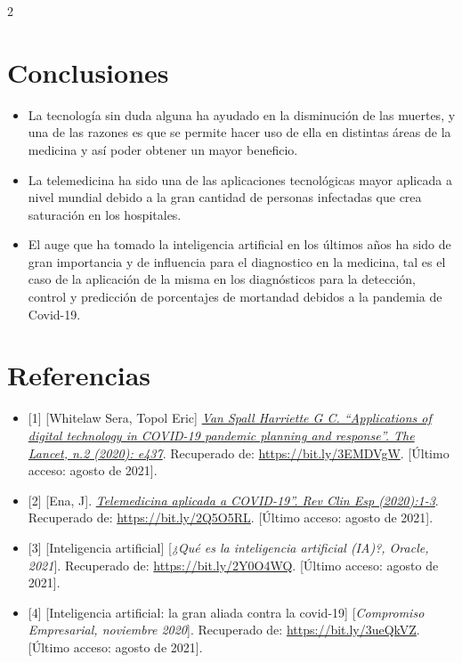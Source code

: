 \documentclass[12pt,spanish,Letterpaper,openany]{book}
\begin{document}
\begin {multicols}{2}
\hypertarget{conclusiones-3}{%
\section{Conclusiones}\label{conclusiones-3}}

\begin{itemize}
\item
  La tecnología sin duda alguna ha ayudado en la disminución de las muertes, y una de las razones
  es que se permite hacer uso de ella en distintas áreas de la medicina y así poder obtener un mayor
  beneficio.
\item
  La telemedicina ha sido una de las aplicaciones tecnológicas mayor aplicada a nivel mundial
  debido a la gran cantidad de personas infectadas que crea saturación en los hospitales.
\item
  El auge que ha tomado la inteligencia artificial en los últimos años ha sido de gran importancia y
  de influencia para el diagnostico en la medicina, tal es el caso de la aplicación de la misma en los
  diagnósticos para la detección, control y predicción de porcentajes de mortandad debidos a la
  pandemia de Covid-19.
\end{itemize}

\hypertarget{referencias-4}{%
\section{Referencias}\label{referencias-4}}

\begin{itemize}
\item
  {[}1{]} {[}Whitelaw Sera, Topol Eric{]} \href{https://www.thelancet.com/journals/landig/article/PIIS2589-7500(20)30142-4/fulltext\#\%20}{\emph{Van Spall Harriette G C. ``Applications of digital technology in COVID-19 pandemic planning and response''. The Lancet, n.2 (2020): e437}}. Recuperado de: \url{https://bit.ly/3EMDVgW}. {[}Último acceso: agosto de 2021{]}.
\item
  {[}2{]} {[}Ena, J{]}. \href{https://bit.ly/3ofpzjz}{\emph{Telemedicina aplicada a COVID-19''. Rev Clin Esp (2020):1-3}}. Recuperado de: \url{https://bit.ly/2Q5O5RL}. {[}Último acceso: agosto de 2021{]}.
\item
  {[}3{]} {[}Inteligencia artificial{]} {[}\emph{¿Qué es la inteligencia artificial (IA)?, Oracle, 2021}{]}. Recuperado de: \url{https://bit.ly/2Y0O4WQ}. {[}Último acceso: agosto de 2021{]}.
\item
  {[}4{]} {[}Inteligencia artificial: la gran aliada contra la covid-19{]} {[}\emph{Compromiso Empresarial, noviembre 2020}{]}. Recuperado de: \url{https://bit.ly/3ueQkVZ}. {[}Último acceso: agosto de 2021{]}.
\end{itemize}

\end {multicols}
\end{document}
